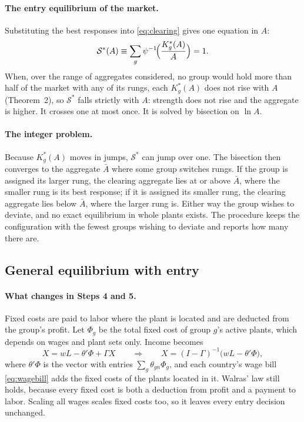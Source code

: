 \documentclass[11pt]{article}
\begin{document}
\paragraph{The entry equilibrium of the market.} Substituting the best responses into
\eqref{eq:clearing} gives one equation in $A$:
\begin{equation}
  \mathcal S^*(A)\equiv\sum_g\psi^{-1}\!\Bigl(\frac{K^*_g(A)}{A}\Bigr)=1 .
  \label{eq:entryclearing}
\end{equation}
When, over the range of aggregates considered, no group would hold more than half of
the market with any of its rungs, each $K^*_g(A)$ does not rise with $A$ (Theorem~2), so $\mathcal S^*$ falls strictly with $A$:
strength does not rise and the aggregate is higher. It crosses one at most once. It is solved by
bisection on $\ln A$.

\paragraph{The integer problem.} Because $K^*_g(A)$ moves in jumps, $\mathcal S^*$ can
jump over one. The bisection then converges to the aggregate $\bar A$ where some group
switches rungs. If the group is assigned its larger rung, the clearing aggregate lies at
or above $\bar A$, where the smaller rung is its best response; if it is assigned its
smaller rung, the clearing aggregate lies below $\bar A$, where the larger rung is.
Either way the group wishes to deviate, and no exact equilibrium in whole plants exists.
The procedure keeps the configuration with the fewest groups wishing to deviate and
reports how many there are.

\subsection{General equilibrium with entry}

\paragraph{What changes in Steps 4 and 5.} Fixed costs are paid to labor where the plant
is located and are deducted from the group's profit. Let $\Phi_g$ be the total fixed
cost of group $g$'s active plants, which depends on wages and plant sets only. Income
becomes
\[
  X=wL-\theta'\Phi+\Gamma X
  \qquad\Longrightarrow\qquad
  X=(I-\Gamma)^{-1}\bigl(wL-\theta'\Phi\bigr),
\]
where $\theta'\Phi$ is the vector with entries $\sum_g\theta_{gn}\Phi_g$, and each
country's wage bill \eqref{eq:wagebill} adds the fixed costs of the plants located in
it. Walras' law still holds, because every fixed cost is both a deduction from profit
and a payment to labor. Scaling all wages scales fixed costs too, so it leaves every
entry decision unchanged.
\end{document}
